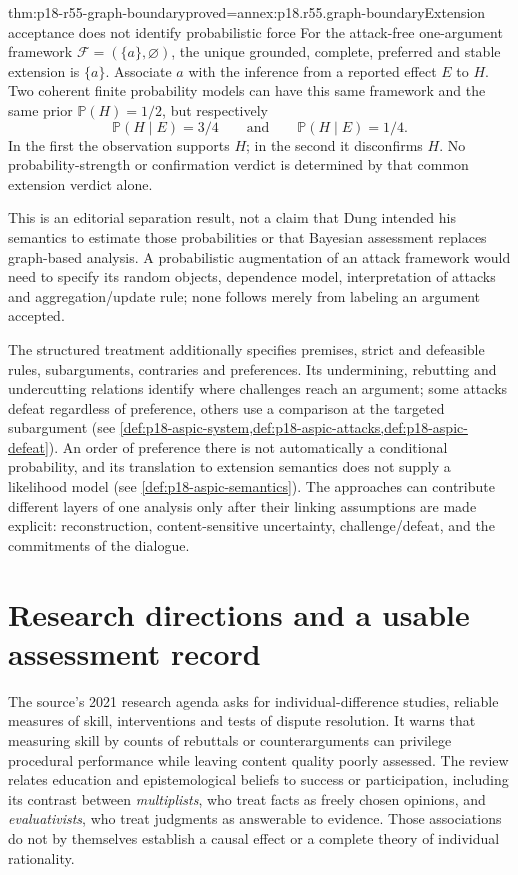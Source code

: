 \begin{hbtheorem}{thm:p18-r55-graph-boundary}{proved=annex:p18.r55.graph-boundary}{Extension acceptance does not identify probabilistic force}
For the attack-free one-argument framework \(\mathcal F=(\{a\},\varnothing)\),
the unique grounded, complete, preferred and stable extension is \(\{a\}\).
Associate \(a\) with the inference from a reported effect \(E\)
to \(H\). Two coherent finite probability models can have this same
framework and the same prior \(\mathbb P(H)=1/2\), but respectively
\[
 \mathbb P(H\mid E)=3/4\qquad\text{and}\qquad
 \mathbb P(H\mid E)=1/4.
\]
In the first the observation supports \(H\); in the second it
disconfirms \(H\). No probability-strength or confirmation verdict
is determined by that common extension verdict alone.
\end{hbtheorem}

This is an editorial separation result, not a claim that Dung intended
his semantics to estimate those probabilities or that Bayesian assessment
replaces graph-based analysis. A probabilistic augmentation of an attack
framework would need to specify its random objects, dependence model,
interpretation of attacks and aggregation/update rule; none follows
merely from labeling an argument accepted.

The structured treatment additionally specifies premises, strict and
defeasible rules, subarguments, contraries and preferences. Its undermining,
rebutting and undercutting relations identify where challenges reach an
argument; some attacks defeat regardless of preference, others use a
comparison at the targeted subargument
(see \cref{def:p18-aspic-system,def:p18-aspic-attacks,def:p18-aspic-defeat}).
An order of preference there is not automatically a conditional probability,
and its translation to extension semantics does not supply a likelihood
model (see \cref{def:p18-aspic-semantics}). The approaches can contribute
different layers of one analysis only after their linking assumptions
are made explicit: reconstruction, content-sensitive uncertainty,
challenge/defeat, and the commitments of the dialogue.

\section{Research directions and a usable assessment record}

The source's 2021 research agenda asks for individual-difference studies,
reliable measures of skill, interventions and tests of dispute resolution.
It warns that measuring skill by counts of rebuttals or counterarguments
can privilege procedural performance while leaving content quality poorly
assessed. The review relates education and epistemological beliefs to
success or participation, including its contrast between
\emph{multiplists}, who treat facts as freely chosen opinions, and
\emph{evaluativists}, who treat judgments as answerable to evidence.
Those associations do not by themselves establish a causal effect or
a complete theory of individual rationality.

